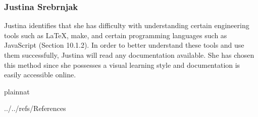 \documentclass[12pt]{article}
\begin{document}
\subsubsection{Justina Srebrnjak}
Justina identifies that she has difficulty with understanding certain engineering tools such as \LaTeX, make, and certain programming languages such as JavaScript (Section 10.1.2). In order to better understand these tools and use them successfully, Justina will read any documentation available. She has chosen this method since she possesses a visual learning style and documentation is easily accessible online.

 {plainnat}

 {../../refs/References}
\end{document}
